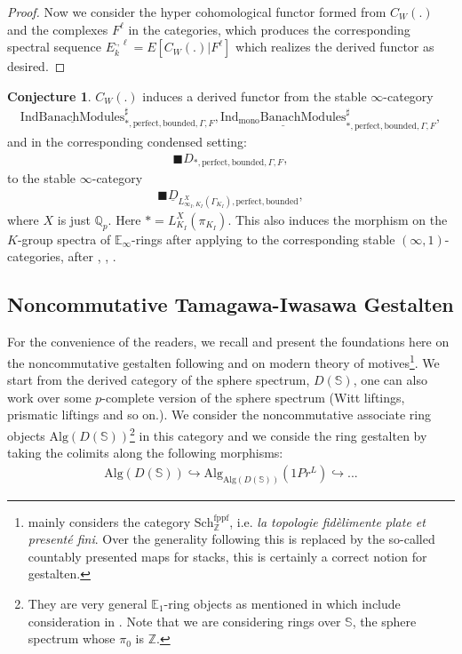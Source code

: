 \documentclass[12pt]{article}
\theoremstyle{definition}
\newtheorem{conjecture}{Conjecture}
\begin{document}
\begin{proof}
Now we consider the hyper cohomological functor formed from $C_{W}(.)$ and the complexes $F^\ell$ in the categories, which produces the corresponding spectral sequence $E_k^{.,\ell}=E[C_{W}(.)|F^\ell]$ which realizes the derived functor as desired.
\end{proof}

\begin{conjecture}
$C_{W}(.)$ induces a derived functor from the stable $\infty$-category 
\begin{align}
\underline{\mathrm{IndBanachModules}}^\sharp_{*,\mathrm{perfect},\mathrm{bounded},\Gamma,F}, \underline{\mathrm{Ind_{\mathrm{mono}}BanachModules}}^\sharp_{*,\mathrm{perfect},\mathrm{bounded},\Gamma,F},
\end{align}
and in the corresponding condensed setting:
\begin{align}
\blacksquare D_{*,\mathrm{perfect},\mathrm{bounded},\Gamma,F},
\end{align}
to the stable $\infty$-category 
\begin{align}
\blacksquare\underline{D}_{L^X_{\infty_I,K_I}(\Gamma_{K_I}),\mathrm{perfect},\mathrm{bounded}},
\end{align}
where $X$ is just $\mathbb{Q}_p$. Here $*=L_{K_I}^X(\pi_{K_I})$. This also induces the morphism on the $K$-group spectra of $\mathbb{E}_\infty$-rings after applying \cite{BGT} to the corresponding stable $(\infty,1)$-categories, after \cite{G2}, \cite{A2}, \cite{BGT}.
\end{conjecture}

\subsection{Noncommutative Tamagawa-Iwasawa Gestalten}\label{ntig}

\noindent For the convenience of the readers, we recall and present the foundations here on the noncommutative gestalten following \cite{5S5} and \cite{5S4} on modern theory of motives\footnote{\cite{5S4} mainly considers the category $\mathrm{Sch}^\mathrm{fppf}_\mathbb{Z}$, i.e. \textit{la topologie fid\`elimente plate et present\'e fini}. Over the generality following \cite{5S5} this is replaced by the so-called countably presented maps for stacks, this is certainly a correct notion for gestalten.}. We start from the derived category of the sphere spectrum, $D(\mathbb{S})$, one can also work over some $p$-complete version of the sphere spectrum (Witt liftings, prismatic liftings and so on.). We consider the noncommutative associate ring objects $\mathrm{Alg}(D(\mathbb{S}))$\footnote{They are very general $\mathbb{E}_1$-ring objects as mentioned in \cite{5S5} which include consideration in \cite{CS1}. Note that we are considering rings over $\mathbb{S}$, the sphere spectrum whose $\pi_0$ is $\mathbb{Z}$.} in this category and we conside the ring gestalten by taking the colimits along the following morphisms:
\begin{align}
\mathrm{Alg}(D(\mathbb{S}))\hookrightarrow \mathrm{Alg}_{\mathrm{Alg}(D(\mathbb{S}))}(1Pr^L)\hookrightarrow ...
\end{align}
\end{document}
